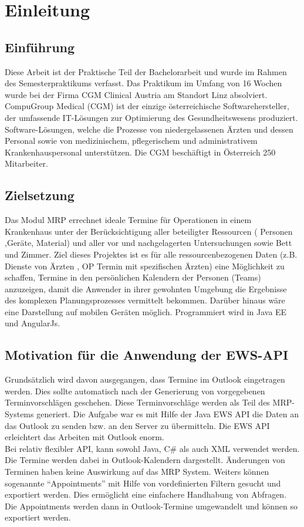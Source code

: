 \chapter{Einleitung}

\section{Einführung}
Diese Arbeit ist der Praktische Teil der Bachelorarbeit und wurde im Rahmen des Semesterpraktikums verfasst. Das Praktikum im Umfang von 16 Wochen wurde bei der Firma CGM Clinical Austria am Standort Linz absolviert. CompuGroup Medical (CGM) ist der einzige österreichische Softwarehersteller, der umfassende IT-Lösungen zur Optimierung des Gesundheitswesens produziert. Software-Lösungen, welche die Prozesse von niedergelassenen Ärzten und dessen Personal sowie von medizinischem, pflegerischem und administrativem Krankenhauspersonal unterstützen. Die CGM beschäftigt in Österreich 250 Mitarbeiter.

\section{Zielsetzung}
Das Modul MRP errechnet ideale Termine für Operationen in einem Krankenhaus unter der Berücksichtigung aller beteiligter Ressourcen ( Personen ,Geräte, Material) und aller vor und nachgelagerten Untersuchungen sowie Bett und Zimmer. Ziel dieses Projektes ist es für alle ressourcenbezogenen Daten (z.B. Dienste von Ärzten , OP Termin mit spezifischen Ärzten) eine Möglichkeit zu schaffen, Termine in den persönlichen Kalendern der Personen (Teams) anzuzeigen, damit die Anwender in ihrer gewohnten Umgebung die Ergebnisse des komplexen Planungsprozesses vermittelt bekommen. Darüber hinaus wäre eine Darstellung auf mobilen Geräten möglich. Programmiert wird in Java EE und AngularJs.
 
\section{Motivation für die Anwendung der EWS-API}
Grundsätzlich wird davon ausgegangen, dass Termine im Outlook eingetragen werden. Dies sollte automatisch nach der Generierung von vorgegebenen Terminvorschlägen geschehen. Diese Terminvorschläge werden als Teil des MRP-Systems generiert. Die Aufgabe war es mit Hilfe der Java EWS API die Daten an das Outlook zu senden bzw. an den Server zu übermitteln. Die EWS API erleichtert das Arbeiten mit Outlook enorm.\\

Bei relativ flexibler API, kann sowohl Java, C\# als auch  XML verwendet werden. Die Termine werden dabei in Outlook-Kalendern dargestellt. Änderungen von Terminen haben keine Auswirkung auf das MRP System. Weiters können sogenannte "`Appointments"' mit Hilfe von vordefinierten Filtern gesucht und exportiert werden. Dies ermöglicht eine einfachere Handhabung von Abfragen. Die Appointments werden dann in Outlook-Termine umgewandelt und können so exportiert werden. 